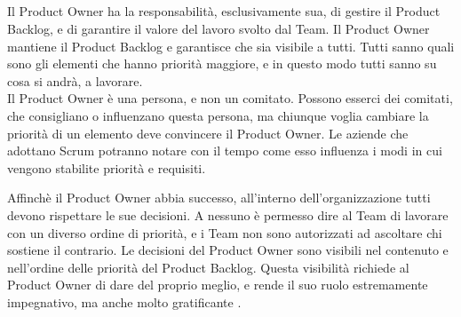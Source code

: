 \subsection*{\color{Blue}{IL PRODUCT OWNER}}
\label{sec:productowner}
Il Product Owner ha la responsabilit\`a, esclusivamente sua, di gestire il Product Backlog, e di garantire il valore
del lavoro svolto dal Team. Il Product Owner mantiene il Product Backlog e garantisce che sia visibile a tutti. Tutti
sanno quali sono gli elementi che hanno priorit\`a maggiore, e in questo modo tutti sanno su cosa si andr\`a, a
lavorare. \\ Il Product Owner \`e una persona, e non un comitato. Possono esserci dei comitati, che consigliano o
influenzano questa persona, ma chiunque voglia cambiare la priorit\`a di un elemento deve convincere il Product Owner.
Le aziende che adottano Scrum potranno notare con il tempo come esso influenza i modi in cui vengono stabilite
priorit\`a e requisiti.



Affinch\`e il Product Owner abbia successo, all'interno dell'organizzazione tutti devono rispettare le sue decisioni. A
nessuno \`e permesso dire al Team di lavorare con un diverso ordine di priorit\`a, e i Team non sono autorizzati ad
ascoltare chi sostiene il contrario. Le decisioni del Product Owner sono visibili nel contenuto e nell'ordine delle
priorit\`a del Product Backlog. Questa visibilit\`a richiede al Product Owner di dare del proprio meglio, e rende il
suo ruolo estremamente impegnativo, ma anche molto gratificante .\\

